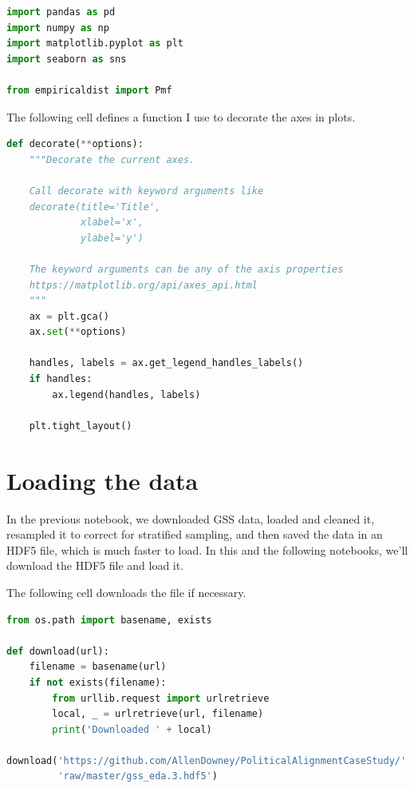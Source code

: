\begin{lstlisting}[language=Python,style=source]
import pandas as pd
import numpy as np
import matplotlib.pyplot as plt
import seaborn as sns

from empiricaldist import Pmf
\end{lstlisting}

The following cell defines a function I use to decorate the axes in
plots.

\begin{lstlisting}[language=Python,style=source]
def decorate(**options):
    """Decorate the current axes.
    
    Call decorate with keyword arguments like
    decorate(title='Title',
             xlabel='x',
             ylabel='y')
             
    The keyword arguments can be any of the axis properties
    https://matplotlib.org/api/axes_api.html
    """
    ax = plt.gca()
    ax.set(**options)
    
    handles, labels = ax.get_legend_handles_labels()
    if handles:
        ax.legend(handles, labels)

    plt.tight_layout()
\end{lstlisting}

\hypertarget{loading-the-data}{%
\section{Loading the data}\label{loading-the-data}}

In the previous notebook, we downloaded GSS data, loaded and cleaned it,
resampled it to correct for stratified sampling, and then saved the data
in an HDF5 file, which is much faster to load. In this and the following
notebooks, we'll download the HDF5 file and load it.

The following cell downloads the file if necessary.

\begin{lstlisting}[language=Python,style=source]
from os.path import basename, exists

def download(url):
    filename = basename(url)
    if not exists(filename):
        from urllib.request import urlretrieve
        local, _ = urlretrieve(url, filename)
        print('Downloaded ' + local)

download('https://github.com/AllenDowney/PoliticalAlignmentCaseStudy/' +
         'raw/master/gss_eda.3.hdf5')
\end{lstlisting}

